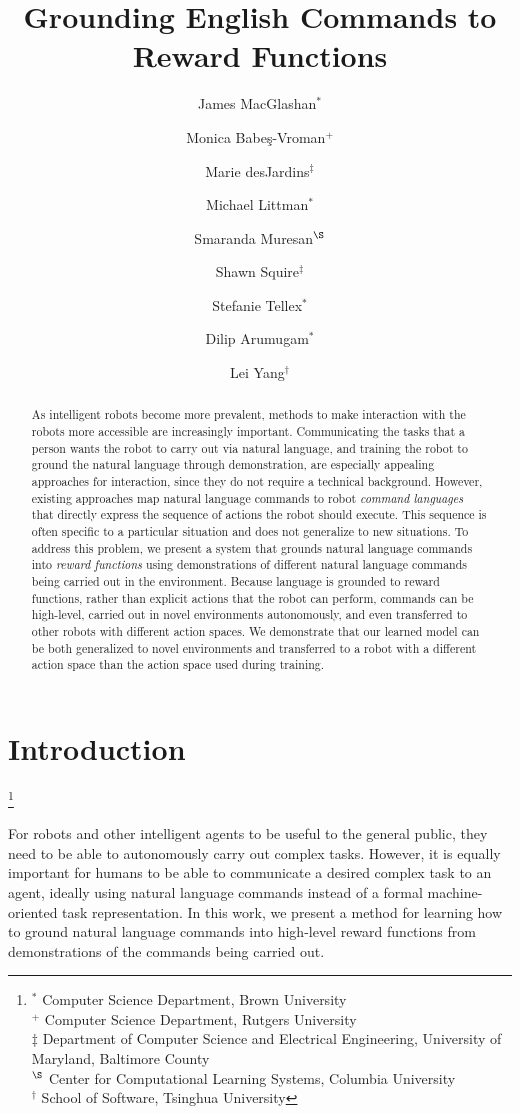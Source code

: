 \documentclass[conference]{IEEEtran}
\title{Grounding English Commands to Reward Functions}
\author{James MacGlashan$^*$
\and Monica Babe\c{s}-Vroman$^+$
\and Marie desJardins$^{\ddagger}$
\and Michael Littman$^*$
\and Smaranda Muresan$^{\S}$ 
\and Shawn Squire$^{\ddagger}$
\and Stefanie Tellex$^*$
\and Dilip Arumugam$^*$
\and Lei Yang$^\dagger$
}
\newcommand\blfootnote[1]{%
  \begingroup
  \renewcommand\thefootnote{}\footnote{#1}%
  \addtocounter{footnote}{-1}%
  \endgroup
}
\begin{document}
\maketitle

\begin{abstract}
As intelligent robots become more prevalent, methods to make
interaction with the robots more accessible are increasingly
important. Communicating the tasks that a person wants the robot to
carry out via natural language, and training the robot to ground the
natural language through demonstration, are especially appealing
approaches for interaction, since they do not require a technical
background.  However, existing approaches map natural language commands
to robot {\em command languages} that directly express the sequence of
actions the robot should execute.  This sequence is often specific to
a particular situation and does not generalize to new situations.  To
address this problem, we present a system that grounds natural
language commands into {\em reward functions} using demonstrations of
different natural language commands being carried out in the
environment.  Because language is grounded to reward functions, rather
than explicit actions that the robot can perform, commands can be
high-level, carried out in novel environments autonomously, and even
transferred to other robots with different action spaces. We
demonstrate that our learned model can be both generalized to novel
environments and transferred to a robot with a different action
space than the action space used during training.
\end{abstract}

\IEEEpeerreviewmaketitle

\section{Introduction}
\blfootnote{$^*$ Computer Science Department, Brown University\\
$^+$ Computer Science Department, Rutgers University\\
$\ddagger$ Department of Computer Science and Electrical Engineering, University of Maryland, Baltimore County\\
$^{\S}$ Center for Computational Learning Systems, Columbia University\\
$^\dagger$ School of Software, Tsinghua University
}
For robots and other intelligent agents to be useful to the general
public, they need to be able to autonomously carry out complex
tasks. However, it is equally important for humans to be able to
communicate a desired complex task to an agent, ideally using natural
language commands instead of a formal machine-oriented task
representation. In this work, we present a method for learning
how to ground natural language commands into high-level reward functions
from demonstrations of the commands being carried out.
\end{document}
